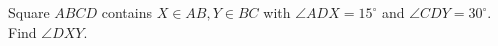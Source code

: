 Square $ ABCD $ contains $ X\in AB,Y\in BC $ with $\angle ADX=15^\circ $ and $\angle CDY=30^\circ $. Find $\angle DXY $.
